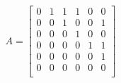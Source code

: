 \documentclass[UTF8]{article}
\begin{document}
\[ 
    A= \begin{bmatrix}
    0 & 1 & 1 & 1 & 0 & 0 \\ 
    0 & 0 & 1 & 0 & 0 & 1 \\ 
    0 & 0 & 0 & 1 & 0 & 0 \\ 
    0 & 0 & 0 & 0 & 1 & 1 \\ 
    0 & 0 & 0 & 0 & 0 & 1 \\ 
    0 & 0 & 0 & 0 & 0 & 0 \\ 
    \end{bmatrix} 
\]
\end{document}
